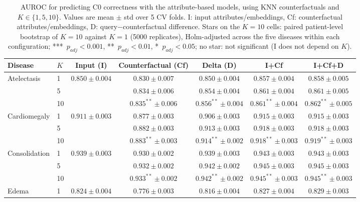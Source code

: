 \begin{table}[htbp]
\centering
\small
\caption{AUROC for predicting C0 correctness with the attribute-based models, using KNN counterfactuals and $K \in \{1,5,10\}$. Values are mean $\pm$ std over 5 CV folds. I: input attributes/embeddings, Cf: counterfactual attributes/embeddings, D: query$-$counterfactual difference. Stars on the $K=10$ cells: paired patient-level bootstrap of $K=10$ against $K=1$ (5000 replicates), Holm-adjusted across the five diseases within each configuration; ***~$p_{adj} < 0.001$, **~$p_{adj} < 0.01$, *~$p_{adj} < 0.05$; no star: not significant (I does not depend on $K$).}
\label{tab:attr_knn_k}
\begin{tabular}{llccccc}
\toprule
Disease & $K$ & Input (I) & Counterfactual (Cf) & Delta (D) & I+Cf & I+Cf+D \\
\midrule
\multirow{3}{*}{Atelectasis} & 1 & \multirow{3}{*}{$0.850 \pm 0.004$} & $0.830 \pm 0.007$ & $0.850 \pm 0.004$ & $0.857 \pm 0.004$ & $\mathbf{0.858} \pm 0.005$ \\
 & 5 &  & $0.834 \pm 0.006$ & $0.854 \pm 0.004$ & $0.861 \pm 0.004$ & $\mathbf{0.861} \pm 0.005$ \\
 & 10 &  & $0.835^{**} \pm 0.006$ & $0.856^{**} \pm 0.004$ & $0.861^{**} \pm 0.004$ & $\mathbf{0.862}^{**} \pm 0.005$ \\
\midrule
\multirow{3}{*}{Cardiomegaly} & 1 & \multirow{3}{*}{$0.911 \pm 0.003$} & $0.877 \pm 0.003$ & $0.906 \pm 0.003$ & $0.915 \pm 0.003$ & $\mathbf{0.915} \pm 0.003$ \\
 & 5 &  & $0.882 \pm 0.003$ & $0.913 \pm 0.003$ & $0.918 \pm 0.003$ & $\mathbf{0.918} \pm 0.003$ \\
 & 10 &  & $0.883^{**} \pm 0.003$ & $0.914^{**} \pm 0.002$ & $0.918^{**} \pm 0.003$ & $\mathbf{0.919}^{**} \pm 0.003$ \\
\midrule
\multirow{3}{*}{Consolidation} & 1 & \multirow{3}{*}{$0.939 \pm 0.003$} & $0.930 \pm 0.002$ & $0.939 \pm 0.003$ & $\mathbf{0.943} \pm 0.003$ & $0.943 \pm 0.003$ \\
 & 5 &  & $0.932 \pm 0.002$ & $0.942 \pm 0.002$ & $0.945 \pm 0.003$ & $\mathbf{0.945} \pm 0.003$ \\
 & 10 &  & $0.933^{**} \pm 0.002$ & $0.942^{**} \pm 0.002$ & $0.945^{**} \pm 0.003$ & $\mathbf{0.945}^{**} \pm 0.003$ \\
\midrule
\multirow{3}{*}{Edema} & 1 & \multirow{3}{*}{$0.824 \pm 0.004$} & $0.776 \pm 0.003$ & $0.816 \pm 0.004$ & $0.827 \pm 0.004$ & $\mathbf{0.829} \pm 0.003$ \\

\end{tabular}
\end{table}
